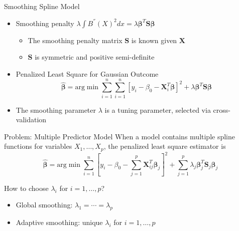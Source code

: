 \documentclass[
  ignorenonframetext,
  aspectratio=169]{beamer}
\providecommand{\tightlist}{%
  \setlength{\itemsep}{0pt}\setlength{\parskip}{0pt}}
\newcommand{\bs}[1]{\boldsymbol{#1}}
\begin{document}
\begin{frame}{Smoothing Spline Model}
\protect\hypertarget{smoothing-spline-model}{}
\begin{itemize}
\item
  Smoothing penalty
  \(\lambda \int B^{''}(X)^2dx = \lambda \bs \beta^T \bs S \bs\beta\)

  \begin{itemize}
  \tightlist
  \item
    The smoothing penalty matrix \(\bs S\) is known given \(\bs X\)
  \item
    \(\bs S\) is symmetric and positive semi-definite
  \end{itemize}
\item
  Penalized Least Square for Gaussian Outcome \[
  \boldsymbol{\hat \beta} = \text{arg}\min \sum\limits^n_{i=1} \sum\limits^n_{i=1} \left[y_i - \beta_0 - \bs X_i^T \bs \beta \right]^2 + \lambda \bs \beta^T \bs S \bs\beta
  \]
\item
  The smoothing parameter \(\lambda\) is a tuning parameter, selected
  via cross-validation
\end{itemize}
\end{frame}

\begin{frame}{Problem: Multiple Predictor Model}
\protect\hypertarget{problem-multiple-predictor-model}{}
When a model contains multiple spline functions for variables
\(X_1, \dots, X_p\), the penalized least square estimator is \[
\boldsymbol{\hat \beta} = \text{arg}\min \sum\limits^n_{i=1}  \left[y_i - \beta_0 - \sum\limits_{j=1}^p \bs X_{ij}^T \bs \beta_j \right]^2 + \sum\limits_{j=1}^p\lambda_j \bs \beta_j^T \bs S_j \bs\beta_j
\]

\begin{tcolorbox}[colback=green!5,colframe=green!40!black,title=Question]
How to choose $\lambda_i$ for $i = 1, \dots, p$?
  \begin{itemize}
    \item Global smoothing: $\lambda_1 = \cdots =\lambda_p$
    \item Adaptive smoothing: unique $\lambda_i$ for $i = 1, \dots, p$
  \end{itemize}
\end{tcolorbox}
\end{frame}
\end{document}
